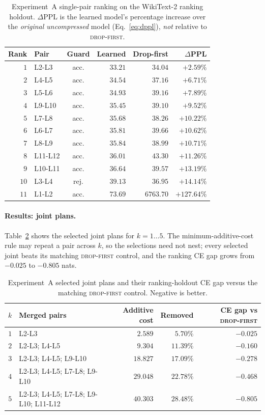 \documentclass[10pt,a4paper]{article}
\newcommand{\dropfirst}{\textsc{drop-first}}
\begin{document}
\begin{table}[t]
\centering
\small
\begin{tabular}{rlc rr r}
\toprule
Rank & Pair & Guard & Learned & Drop-first & $\Delta$PPL \\
\midrule
$1$  & L2-L3   & acc. & $33.21$ & $34.04$ & $+2.59\%$ \\
$2$  & L4-L5   & acc. & $34.54$ & $37.16$ & $+6.71\%$ \\
$3$  & L5-L6   & acc. & $34.93$ & $39.16$ & $+7.89\%$ \\
$4$  & L9-L10  & acc. & $35.45$ & $39.10$ & $+9.52\%$ \\
$5$  & L7-L8   & acc. & $35.68$ & $38.26$ & $+10.22\%$ \\
$6$  & L6-L7   & acc. & $35.81$ & $39.66$ & $+10.62\%$ \\
$7$  & L8-L9   & acc. & $35.84$ & $38.99$ & $+10.71\%$ \\
$8$  & L11-L12 & acc. & $36.01$ & $43.30$ & $+11.26\%$ \\
$9$  & L10-L11 & acc. & $36.64$ & $39.57$ & $+13.19\%$ \\
$10$ & L3-L4   & rej. & $39.13$ & $36.95$ & $+14.14\%$ \\
$11$ & L1-L2   & acc. & $73.69$ & $6763.70$ & $+127.64\%$ \\
\bottomrule
\end{tabular}
\caption{Experiment~A single-pair ranking on the WikiText-2 ranking holdout.
$\Delta$PPL is the learned model's percentage increase over the \emph{original
uncompressed} model (Eq.~\ref{eq:dppl}), \emph{not} relative to \dropfirst{}.}
\label{tab:ranking}
\end{table}

\paragraph{Results: joint plans.} Table~\ref{tab:joint} shows the selected joint
plans for $k=1\dots5$. The minimum-additive-cost rule may repeat a pair across
$k$, so the selections need not nest; every selected joint beats its matching
\dropfirst{} control, and the ranking CE gap grows from $-0.025$ to $-0.805$
nats.

\begin{table}[t]
\centering
\small
\begin{tabular}{c l r r r}
\toprule
$k$ & Merged pairs & Additive cost & Removed & CE gap vs \dropfirst{} \\
\midrule
$1$ & L2-L3 & $2.589$ & $5.70\%$ & $-0.025$ \\
$2$ & L2-L3; L4-L5 & $9.304$ & $11.39\%$ & $-0.160$ \\
$3$ & L2-L3; L4-L5; L9-L10 & $18.827$ & $17.09\%$ & $-0.278$ \\
$4$ & L2-L3; L4-L5; L7-L8; L9-L10 & $29.048$ & $22.78\%$ & $-0.468$ \\
$5$ & L2-L3; L4-L5; L7-L8; L9-L10; L11-L12 & $40.303$ & $28.48\%$ & $-0.805$ \\
\bottomrule
\end{tabular}
\caption{Experiment~A selected joint plans and their ranking-holdout CE gap
versus the matching \dropfirst{} control. Negative is better.}
\label{tab:joint}
\end{table}
\end{document}
